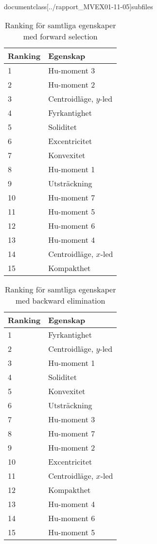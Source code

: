 documentclass[../rapport_MVEX01-11-05]{subfiles}

\begin{table}[tb]
	\centering
	\caption{Ranking för samtliga egenskaper med forward selection}
	
	\label{tab:bestfeatsfwd}
	\begin{tabular}{ll}
		\toprule
		Ranking & Egenskap \\
		\midrule
		1 & Hu-moment 3 \\
		2 & Hu-moment 2 \\
		3 & Centroidläge, $y$-led \\
		4 & Fyrkantighet \\
		5 & Soliditet \\
		6 & Excentricitet \\
		7 & Konvexitet \\
		8 & Hu-moment 1 \\
                9 & Utsträckning \\
                10 & Hu-moment 7 \\
                11 & Hu-moment 5 \\
                12 & Hu-moment 6 \\
                13 & Hu-moment 4 \\
                14 & Centroidläge, $x$-led \\
                15 & Kompakthet\\
		\bottomrule
	\end{tabular}
\end{table}
\begin{table}[tb]
	\centering
	\caption{Ranking för samtliga egenskaper med backward
          elimination}
	
	\label{tab:featsbwd}
	\begin{tabular}{ll}
		\toprule
		Ranking & Egenskap \\
		\midrule
                1 & Fyrkantighet \\
                2 & Centroidläge, $y$-led \\
                3 & Hu-moment 1\\
                4 & Soliditet\\
                5 & Konvexitet \\
                6 & Utsträckning \\
                7 & Hu-moment 3 \\
                8 & Hu-moment 7 \\
                9 & Hu-moment 2 \\
                10 & Excentricitet \\
                11 & Centroidläge, $x$-led \\
                12 & Kompakthet \\
                13 & Hu-moment 4 \\
                14 & Hu-moment 6 \\
                15 & Hu-moment 5 \\
		\bottomrule
	\end{tabular}
\end{table}

